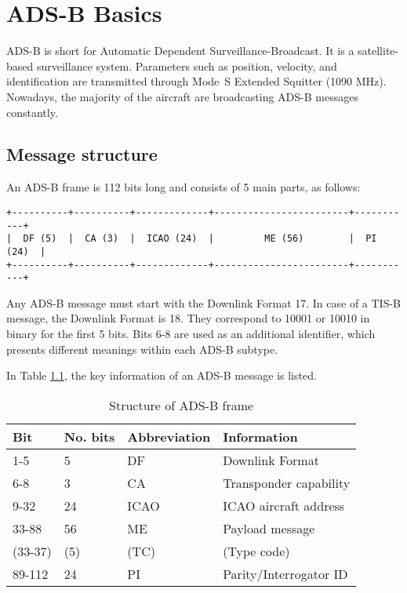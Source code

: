 \chapter{ADS-B Basics} \label{chap:adsb-basic}
ADS-B is short for Automatic Dependent Surveillance-Broadcast. It is a satellite-based surveillance system. Parameters such as position, velocity, and identification are transmitted through Mode~S Extended Squitter (1090 MHz). Nowadays, the majority of the aircraft are broadcasting ADS-B messages constantly.

\section{Message structure}

An ADS-B frame is 112 bits long and consists of 5 main parts, as follows:

\begin{verbatim}
+----------+----------+-------------+------------------------+-----------+
|  DF (5)  |  CA (3)  |  ICAO (24)  |         ME (56)        |  PI (24)  |
+----------+----------+-------------+------------------------+-----------+
\end{verbatim}

Any ADS-B message must start with the Downlink Format 17. In case of a TIS-B message, the Downlink Format is 18. They correspond to 10001 or 10010 in binary for the first 5 bits. Bits 6-8 are used as an additional identifier, which presents different meanings within each ADS-B subtype.

In Table \ref{tb:adsb-structure}, the key information of an ADS-B message is listed.

\begin{table}[!ht]
\centering
\caption{Structure of ADS-B frame}
\label{tb:adsb-structure}
\begin{tabular}{|l|l|l|l|}
\hline
\textbf{Bit} & \textbf{No. bits} & \textbf{Abbreviation} & \textbf{Information} \\ \hline\hline
1-5 & 5 & DF & Downlink Format \\ \hline
6-8 & 3 & CA & Transponder capability \\ \hline
9-32 & 24 & ICAO & ICAO aircraft address \\ \hline
33-88 & 56 & ME & Payload message \\
(33-37) & (5) & (TC) & (Type code) \\ \hline
89-112 & 24 & PI & Parity/Interrogator ID \\ \hline
\end{tabular}
\end{table}

